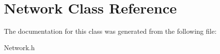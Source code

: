 \hypertarget{class_network}{\section{Network Class Reference}
\label{class_network}
}


The documentation for this class was generated from the following file\-:\begin{DoxyCompactItemize}
\item 
Network.\-h\end{DoxyCompactItemize}
